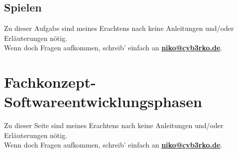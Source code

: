 \documentclass{scrartcl}   %
\begin{document}
\subsection{Spielen}

Zu dieser Aufgabe sind meines Erachtens nach keine Anleitungen und/oder Erläuterungen nötig.\\
Wenn doch Fragen aufkommen, schreib' einfach an \textbf{\href{mailto:niko@cyb3rko.de}{niko@cyb3rko.de}}.

\section{Fachkonzept-Softwareentwicklungsphasen}

Zu dieser Seite sind meines Erachtens nach keine Anleitungen und/oder Erläuterungen nötig.\\
Wenn doch Fragen aufkommen, schreib' einfach an \textbf{\href{mailto:niko@cyb3rko.de}{niko@cyb3rko.de}}.
\end{document}

